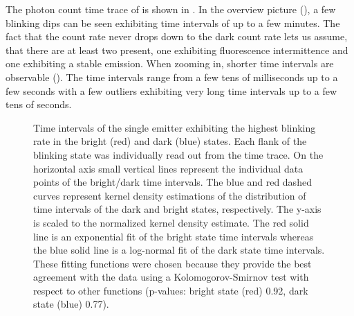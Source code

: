 		The photon count time trace of \emnarrow is shown in .
		In the overview picture (), a few blinking dips can be seen exhibiting time intervals of up to a few minutes.
		The fact that the count rate never drops down to the dark count rate lets us assume, that there are at least two \sivs present, one exhibiting fluorescence intermittence and one exhibiting a stable emission.
		When zooming in, shorter time intervals are observable ().
		The time intervals range from a few tens of milliseconds up to a few seconds with a few outliers exhibiting very long time intervals up to a few tens of seconds.
		
		\begin{figure}[!htb]
			\centering
			\caption[Distributions of bright and dark state intervals]{Time intervals of the single emitter exhibiting the highest blinking rate in the bright (red) and dark (blue) states. Each flank of the blinking state was individually read out from the \pl time trace. On the horizontal axis small vertical lines represent the individual data points of the bright/dark time intervals. The blue and red dashed curves represent kernel density estimations of the distribution of time intervals of the dark and bright states, respectively. The y-axis is scaled to the normalized kernel density estimate. The red solid line is an exponential fit of the bright state time intervals whereas the blue solid line is a log-normal fit of the dark state time intervals. These fitting functions were chosen because they provide the best agreement with the data using a Kolomogorov-Smirnov test with respect to other functions (p-values: bright state (red) 0.92, dark state (blue) 0.77).}
			\label{fig::fit_blink_distr}
		\end{figure}

